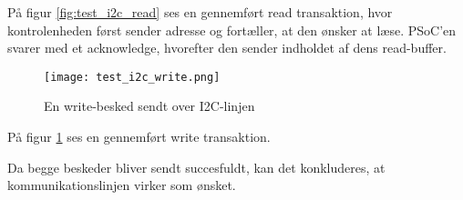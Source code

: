 På figur \ref{fig:test_i2c_read} ses en gennemført read transaktion, hvor kontrolenheden først sender adresse og fortæller, at den ønsker at læse. PSoC'en svarer med et acknowledge, hvorefter den sender indholdet af dens read-buffer. 

\begin{figure}[H]  %
\centering
\texttt{[image: test\_i2c\_write.png]}
\caption{En write-besked sendt over I2C-linjen}
\label{fig:test_i2c_write}
\end{figure}

På figur \ref{fig:test_i2c_write} ses en gennemført write transaktion.

Da begge beskeder bliver sendt succesfuldt, kan det konkluderes, at kommunikationslinjen virker som ønsket.

%